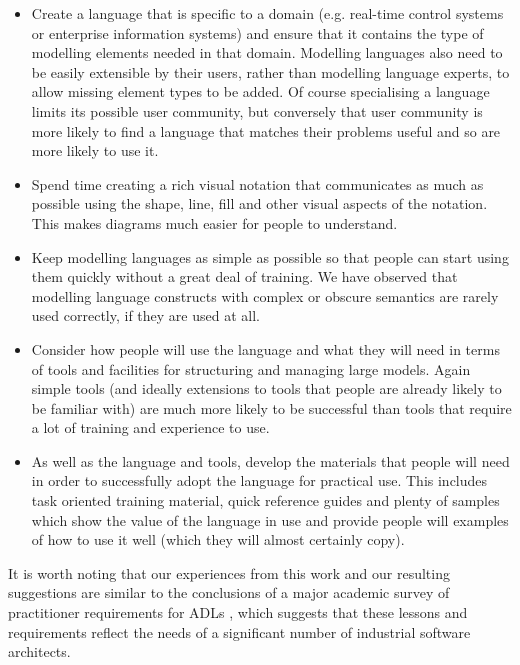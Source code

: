 \begin{itemize}
\item Create a language that is specific to a domain (e.g. real-time control systems or enterprise information systems) and ensure that it contains the type of modelling elements needed in that domain.  Modelling languages also need to be easily extensible by their users, rather than modelling language experts, to allow missing element types to be added.  Of course specialising a language limits its possible user community, but conversely that user community is more likely to find a language that matches their problems useful and so are more likely to use it.

\item Spend time creating a rich visual notation that communicates as much as possible using the shape, line, fill and other visual aspects of the notation.  This makes diagrams much easier for people to understand.

\item Keep modelling languages as simple as possible so that people can start using them quickly without a great deal of training.  We have observed that modelling language constructs with complex or obscure semantics are rarely used correctly, if they are used at all.

\item Consider how people will use the language and what they will need in terms of tools and facilities for structuring and managing large models.  Again simple tools (and ideally extensions to tools that people are already likely to be familiar with) are much more likely to be successful than tools that require a lot of training and experience to use.

\item As well as the language and tools, develop the materials that people will need in order to successfully adopt the language for practical use.  This includes task oriented training material, quick reference guides and plenty of samples which show the value of the language in use and provide people will examples of how to use it well (which they will almost certainly copy).
\end{itemize}

  It is worth noting that our experiences from this work and our resulting suggestions are similar to the conclusions of a major academic survey of practitioner requirements for 
  ADLs \cite{malavolta2013-industryadlneeds}, which suggests that these lessons and requirements reflect the needs of a significant number of industrial software architects.

